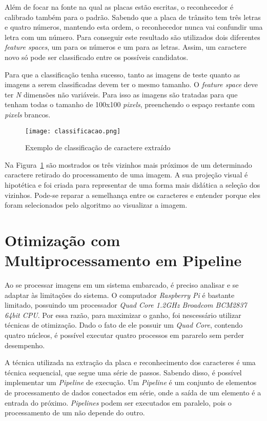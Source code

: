 Além de focar na fonte na qual as placas estão escritas, o reconhecedor é
calibrado também para o padrão. Sabendo que a placa de trânsito tem três letras
e quatro números, mantendo esta ordem, o reconhecedor nunca vai confundir uma
letra com um número. Para conseguir este resultado são utilizados dois
diferentes \emph{feature spaces}, um para os números e um para as letras. Assim,
um caractere novo só pode ser classificado entre os possíveis candidatos.

Para que a classificação tenha sucesso, tanto as imagens de teste quanto as
imagens a serem classificadas devem ter o mesmo tamanho. O \emph{feature space}
deve ter \emph{N} dimensões não variáveis. Para isso as imagens são tratadas
para que tenham todas o tamanho de 100x100 \emph{pixels}, preenchendo o espaço
restante com \emph{pixels} brancos.

\begin{figure}[H]
	\centering
	\texttt{[image: classificacao.png]}
	\caption{Exemplo de classificação de caractere extraído}
	\label{fig:classificacao}
\end{figure}

Na Figura~\ref{fig:classificacao} são mostrados os três vizinhos mais próximos
de um determinado caractere retirado do processamento de uma imagem. A sua
projeção visual é hipotética e foi criada para representar de uma forma mais
didática a seleção dos vizinhos. Pode-se reparar a semelhança entre os
caracteres e entender porque eles foram selecionados pelo algoritmo ao
visualizar a imagem.

\section{Otimização com Multiprocessamento em Pipeline} \label{sec:otimizacao}

Ao se processar imagens em um sistema embarcado, é preciso analisar e se adaptar
às limitações do sistema. O computador \emph{Raspberry Pi} é bastante limitado,
possuindo um processador \emph{Quad Core 1.2GHz Broadcom BCM2837 64bit CPU}. Por
essa razão, para maximizar o ganho, foi nescessário utilizar técnicas de
otimização. Dado o fato de ele possuir um \emph{Quad Core}, contendo quatro
núcleos, é possível executar quatro processos em pararelo sem perder desempenho.

A técnica utilizada na extração da placa e reconhecimento dos caracteres é uma
técnica sequencial, que segue uma série de passos. Sabendo disso, é possível
implementar um \emph{Pipeline} de execução. Um \emph{Pipeline} é um conjunto de
elementos de processamento de dados conectados em série, onde a saída de um
elemento é a entrada do próximo. \emph{Pipelines} podem ser executados em
paralelo, pois o processamento de um não depende do outro.

